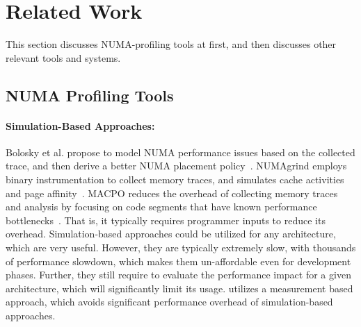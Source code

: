 \section{Related Work}
\label{sec:related}

This section discusses NUMA-profiling tools at first, and then discusses other relevant tools and systems.
\subsection{NUMA Profiling Tools} 



\paragraph{Simulation-Based Approaches:}
 Bolosky et al. propose to model NUMA performance issues based on the collected trace, and then derive a better NUMA placement policy~\cite{Bolosky:1991:NPR:106972.106994}.
 NUMAgrind employs binary instrumentation to collect memory traces, and simulates cache activities and page affinity~\cite{NUMAGrind}. MACPO reduces the overhead of collecting memory traces and analysis by focusing on code segments that have known performance bottlenecks~\cite{MACPO}. That is, it typically requires programmer inputs to reduce its overhead.  Simulation-based approaches could be utilized for any architecture, which are very useful. However, they are typically extremely slow, with thousands of performance slowdown, which makes them un-affordable even for development phases. Further, they still require to evaluate the performance impact for a given architecture, which will significantly limit its usage. \NP{} utilizes a measurement based approach, which avoids significant performance overhead of simulation-based approaches. 

